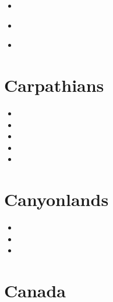 \begin{small}
\begin{itemize}
\item[\twothousandfifteen]
\\
\item[\twothousandtwentytwo]
 \\
\item[\twothousandtwentythree]
\end{itemize}
\end{small}


\section{Carpathians}

\begin{small}
\begin{itemize}
\item[\twothousand]
\item[\twothousandfour]
\item[\twothousandfive]
\item[\twothousandsix]
\item[\twothousandnineteen]
\end{itemize}
\end{small}

\section{Canyonlands}

\begin{small}
\begin{itemize}
\item[\nineteenninetyfour]
\item[\twothousandtwo]
\item[\twothousandthree]
\end{itemize}
\end{small}

\section{Canada}

